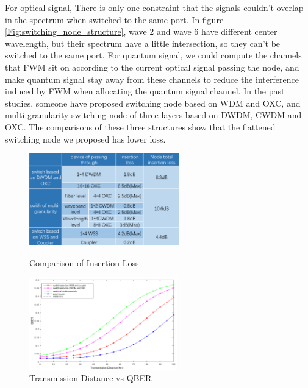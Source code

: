 \documentclass[letterpaper,10pt]{article}
\begin{document}
For optical signal, There is only one constraint that the signals couldn't overlap in the spectrum when switched to the same port. In figure \ref{Fig:switching_node_structure}, wave 2 and wave 6 have different center wavelength, but their spectrum have a little intersection, so they can't be switched to the same port. For quantum signal, we could compute the channels that FWM sit on according to the current optical signal passing the node, and make quantum signal stay away from these channels to reduce the interference induced by FWM when allocating the quantum signal channel. In the past studies, someone have proposed switching node based on WDM and OXC, and multi-granularity switching node of three-layers based on DWDM, CWDM and OXC. The comparisons of these three structures show that the flattened switching node we proposed has lower loss.

\begin{figure}[!htb]
   \begin{minipage}{0.48\textwidth}
     \centering
     \includegraphics[height= 4cm,width=.9\linewidth]{comparison_of_three_kind_of_nodes}
     \caption{Comparison of Insertion Loss} 
     \label{Fig:loss_of_insertion}
   \end{minipage}\hfill
   \begin{minipage}{0.48\textwidth}
     \centering
     \includegraphics[height= 4cm,width=.9\linewidth]{transmission_distance_vs_QBER_of_three_nodes_3}
     \caption{Transmission Distance vs QBER} 
     \label{Fig:distance_vs_qber}
   \end{minipage}
\end{figure}
\end{document}
